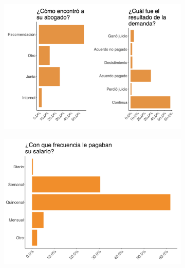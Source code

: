 \documentclass[oneside,11pt]{article}
\begin{document}
\begin{figure}[H]
\begin{center}
    \begin{subfigure}{0.49\textwidth}
    \includegraphics[width=\textwidth]{04_Figures/workey_survey/Exp_5.png}
    \end{subfigure}
    \begin{subfigure}{0.49\textwidth}
    \includegraphics[width=\textwidth]{04_Figures/workey_survey/Exp_6.png}
    \end{subfigure}
    
    \end{center}
\end{figure}

\clearpage
\end{document}
